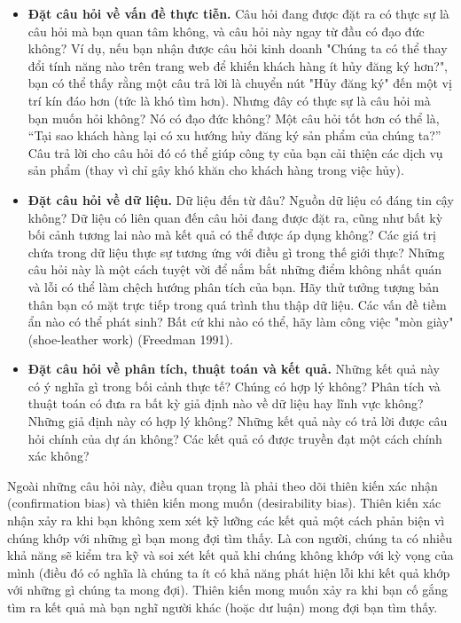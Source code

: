 \begin{itemize}
    \item \textbf{Đặt câu hỏi về vấn đề thực tiễn.} Câu hỏi đang được đặt ra có thực sự là câu hỏi mà bạn quan tâm không, và câu hỏi này ngay từ đầu có đạo đức không? Ví dụ, nếu bạn nhận được câu hỏi kinh doanh "Chúng ta có thể thay đổi tính năng nào trên trang web để khiến khách hàng ít hủy đăng ký hơn?", bạn có thể thấy rằng một câu trả lời là chuyển nút "Hủy đăng ký" đến một vị trí kín đáo hơn (tức là khó tìm hơn). Nhưng đây có thực sự là câu hỏi mà bạn muốn hỏi không? Nó có đạo đức không? Một câu hỏi tốt hơn có thể là, “Tại sao khách hàng lại có xu hướng hủy đăng ký sản phẩm của chúng ta?” Câu trả lời cho câu hỏi đó có thể giúp công ty của bạn cải thiện các dịch vụ sản phẩm (thay vì chỉ gây khó khăn cho khách hàng trong việc hủy).
    \item \textbf{Đặt câu hỏi về dữ liệu.} Dữ liệu đến từ đâu? Nguồn dữ liệu có đáng tin cậy không? Dữ liệu có liên quan đến câu hỏi đang được đặt ra, cũng như bất kỳ bối cảnh tương lai nào mà kết quả có thể được áp dụng không? Các giá trị chứa trong dữ liệu thực sự tương ứng với điều gì trong thế giới thực? Những câu hỏi này là một cách tuyệt vời để nắm bắt những điểm không nhất quán và lỗi có thể làm chệch hướng phân tích của bạn. Hãy thử tưởng tượng bản thân bạn có mặt trực tiếp trong quá trình thu thập dữ liệu. Các vấn đề tiềm ẩn nào có thể phát sinh? Bất cứ khi nào có thể, hãy làm công việc "mòn giày" (shoe-leather work) (Freedman 1991).
    \item \textbf{Đặt câu hỏi về phân tích, thuật toán và kết quả.} Những kết quả này có ý nghĩa gì trong bối cảnh thực tế? Chúng có hợp lý không? Phân tích và thuật toán có đưa ra bất kỳ giả định nào về dữ liệu hay lĩnh vực không? Những giả định này có hợp lý không? Những kết quả này có trả lời được câu hỏi chính của dự án không? Các kết quả có được truyền đạt một cách chính xác không?
\end{itemize}

Ngoài những câu hỏi này, điều quan trọng là phải theo dõi thiên kiến xác nhận (confirmation bias) và thiên kiến mong muốn (desirability bias). Thiên kiến xác nhận xảy ra khi bạn không xem xét kỹ lưỡng các kết quả một cách phản biện vì chúng khớp với những gì bạn mong đợi tìm thấy. Là con người, chúng ta có nhiều khả năng sẽ kiểm tra kỹ và soi xét kết quả khi chúng không khớp với kỳ vọng của mình (điều đó có nghĩa là chúng ta ít có khả năng phát hiện lỗi khi kết quả khớp với những gì chúng ta mong đợi). Thiên kiến mong muốn xảy ra khi bạn cố gắng tìm ra kết quả mà bạn nghĩ người khác (hoặc dư luận) mong đợi bạn tìm thấy.

